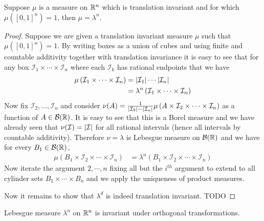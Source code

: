 \begin{lem}\label{LesbegueTranslationInvariance} Suppose $\mu$ is a measure on $\mathbb{R}^n$ which is
  translation invariant and for which $\mu([0,1]^n) = 1$, then $\mu =
  \lambda^n$.
\end{lem}
\begin{proof}Suppose we are given a translation invariant measure
  $\mu$ such that $\mu([0,1]^n) = 1$.  By writing boxes as a
  union of cubes and using finite
  and countable additivity together with translation invariance it is
  easy to see that
  for any box $\mathcal{I}_1 \times \cdots \times \mathcal{I}_n$ where
  each $\mathcal{I}_k$ has rational endpoints that we have 
\begin{align*}
\mu\left (\mathcal{I}_1 \times \cdots \times
    \mathcal{I}_n \right ) &= \left \vert \mathcal{I}_1 \right \vert \cdots
  \left \vert \mathcal{I}_n \right \vert \\
 &= \lambda^n \left (\mathcal{I}_1 \times \cdots \times
    \mathcal{I}_n \right )
\end{align*}
Now fix $\mathcal{I}_2, \dots ,\mathcal{I}_n$ and consider $\nu(A) = \frac{1}{ \left \vert \mathcal{I}_2 \right \vert \cdots  \left \vert \mathcal{I}_n \right \vert}\mu \left
  (A \times \mathcal{I}_2 \times \cdots \times
    \mathcal{I}_n \right ) $ as a function of $A \in
  \mathcal{B}(\mathbb{R})$.  It is easy to see that this is a Borel
  measure and we have already seen that $\nu(\mathcal{I}) =
  \left \vert \mathcal{I} \right \vert$ for all rational intervals (hence all intervals
    by countable additivity).  Therefore $\nu = \lambda$ is Lebesgue
    measure on $\mathcal{B}(\mathbb{R})$ and we have for every $B_1 \in
    \mathcal{B}(\mathbb{R})$,
\begin{align*}
\mu\left (B_1 \times \mathcal{I}_2 \times\cdots \times
    \mathcal{I}_n \right ) 
 &= \lambda^n \left (B_1 \times \mathcal{I}_2 \times \cdots \times
    \mathcal{I}_n \right )
\end{align*}
Now iterate the argument $2, \cdots, n$ fixing all but the $i^{th}$
argument to extend to all cylinder sets $B_1 \times \cdots \times B_n$
and we apply the uniqueness of product measures.

Now it remains to show that $\lambda^d$ is indeed translation
invariant.
TODO
\end{proof}
\begin{cor}\label{LesbegueRotationInvariance} Lebesgue measure $\lambda^n$ on $\mathbb{R}^n$ is invariant
  under orthogonal transformations.
\end{cor}
